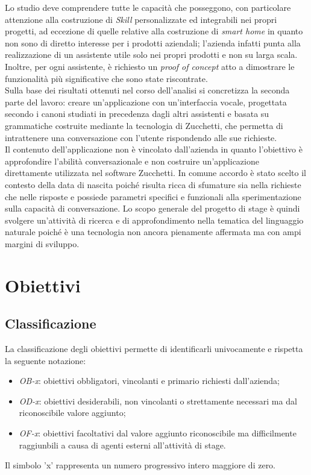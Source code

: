 Lo studio deve comprendere tutte le capacità che posseggono, con particolare attenzione alla costruzione di \textit{Skill} personalizzate ed integrabili nei propri progetti, ad eccezione di quelle relative alla costruzione di \textit{smart home} in quanto non sono di diretto interesse per i prodotti aziendali; l'azienda infatti punta alla realizzazione di un assistente utile solo nei propri prodotti e non su larga scala. Inoltre, per ogni assistente, è richiesto un \textit{proof of concept} atto a dimostrare le funzionalità più significative che sono state riscontrate.\\
Sulla base dei risultati ottenuti nel corso dell'analisi si concretizza la seconda parte del lavoro: creare un'applicazione con un'interfaccia vocale, progettata secondo i canoni studiati in precedenza dagli altri assistenti e basata su grammatiche costruite mediante la tecnologia di Zucchetti, che permetta di intrattenere una conversazione con l'utente rispondendo alle sue richieste. \\
Il contenuto dell'applicazione non è vincolato dall'azienda in quanto l'obiettivo è approfondire l'abilità conversazionale e non costruire un'applicazione direttamente utilizzata nel software Zucchetti. In comune accordo è stato scelto il contesto della data di nascita poiché risulta ricca di sfumature sia nella richieste che nelle risposte e possiede parametri specifici e funzionali alla sperimentazione sulla capacità di conversazione.
Lo scopo generale del progetto di stage è quindi svolgere un'attività di ricerca e di approfondimento nella tematica del linguaggio naturale poiché è una tecnologia non ancora pienamente affermata ma con ampi margini di sviluppo.

\section{Obiettivi}
	\subsection{Classificazione}
	La classificazione degli obiettivi permette di identificarli univocamente e rispetta la seguente notazione:
	\begin{itemize}
		\item \textit{OB-x}: obiettivi obbligatori, vincolanti e primario richiesti dall'azienda;
		\item \textit{OD-x}: obiettivi desiderabili, non vincolanti o strettamente necessari ma dal riconoscibile valore aggiunto;
		\item \textit{OF-x}: obiettivi facoltativi dal valore aggiunto riconoscibile ma difficilmente raggiunbili a causa di agenti esterni all'attività di stage.
	\end{itemize}
	Il simbolo 'x' rappresenta un numero progressivo intero maggiore di zero.
	
